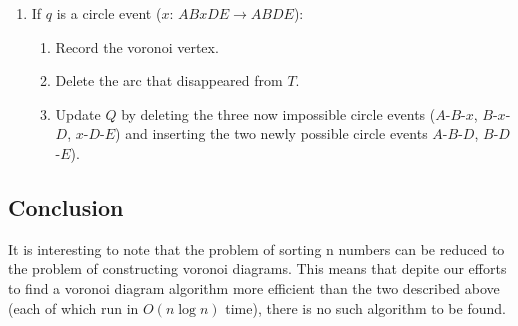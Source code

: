 {\begin{enumerate}
\begin{enumerate}
\begin{enumerate}
\end{enumerate}

\item If $q$ is a circle event ($x$: $A B x D E \rightarrow A B D E$):

\begin{enumerate}

\item Record the voronoi vertex.

\item Delete the arc that disappeared from $T$.

\item Update $Q$ by deleting the three now impossible circle events ($A$-$B$-$x$,
$B$-$x$-$D$, $x$-$D$-$E$) and inserting the two newly possible circle events 
$A$-$B$-$D$, $B$-$D$-$E$).

\end{enumerate}

\end{enumerate}

\end{enumerate}
\hrulefill}

\subsection{Conclusion}

It is interesting to note that the problem of sorting n numbers can be
reduced to the problem of constructing voronoi diagrams.  This means that
depite our efforts to find a voronoi diagram algorithm more efficient
than the two described above (each of which run in $O(n \log n)$ time), there 
is no such algorithm to be found.


